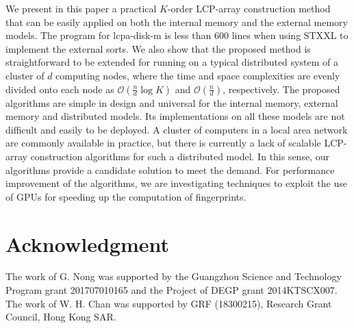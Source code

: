 \documentclass{llncs}
\begin{document}
We present in this paper a practical $K$-order LCP-array construction method that can be easily applied on both the internal memory and the external memory models. The program for lcpa-disk-m is less than 600 lines when using STXXL to implement the external sorts. We also show that the proposed method is straightforward to be extended for running on a typical distributed system of a cluster of $d$ computing nodes, where the time and space complexities are evenly divided onto each node as $\mathcal{O}(\frac{n}{d}\log K)$ and $\mathcal{O}(\frac{n}{d})$, respectively. The proposed algorithms are simple in design and universal for the internal memory, external memory and distributed models. Its implementations on all these models are not difficult and easily to be deployed.
A cluster of computers in a local area network are commonly available in practice, but there is currently a lack of scalable LCP-array construction algorithms for such a distributed model. In this sense, our algorithms provide a candidate solution to meet the demand. For performance improvement of the algorithms, we are investigating techniques to exploit the use of GPUs for speeding up the computation of fingerprints.

\section*{Acknowledgment}
The work of G. Nong was supported by the Guangzhou Science and Technology Program grant 201707010165 and the Project of DEGP grant 2014KTSCX007. The work of W. H. Chan was supported by GRF (18300215), Research Grant Council, Hong Kong SAR.



\end{document}
